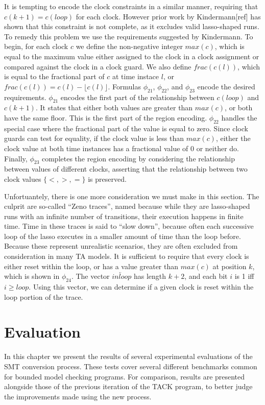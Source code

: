 \documentclass[a4paper,12pt]{article}
\begin{document}
It is tempting to encode the clock constraints in a similar manner, requiring
that \(c(k+1) = c(loop)\) for each clock. However prior work by Kindermann[ref]
has shown that this constraint is not complete, as it excludes valid
lasso-shaped runs. To remedy this problem we use the requirements suggested by
Kindermann. To begin, for each clock \(c\) we define the non-negative integer
\(max(c)\), which is equal to the maximum value either assigned to the clock in
a clock assignment or compared against the clock in a clock guard. We also
define \(frac(c(l))\), which is equal to the fractional part of \(c\) at time
instace \(l\), or \(frac(c(l)) = c(l) - \lfloor c(l) \rfloor\). Formulas
\(\phi_{21}\), \(\phi_{22}\), and \(\phi_{23}\) encode the desired requirements.
\(\phi_{21}\) encodes the first part of the relationship between \(c(loop)\) and
\(c(k+1)\). It states that either both values are greater than \(max(c)\), or
both have the same floor. This is the first part of the region encoding.
\(\phi_{22}\) handles the special case where the fractional part of the value is
equal to zero. Since clock guards can test for equality, if the clock value is
less than \(max(c)\), either the clock value at both time instances has a
fractional value of 0 or neither do. Finally, \(\phi_{23}\) completes the region
encoding by considering the relationship between values of different clocks,
asserting that the relationship between two clock values \(\{<,>,=\}\) is
preserved.

Unfortuantely, there is one more consideration we must make in this section. The
culprit are so-called ``Zeno traces'', named because while they are lasso-shaped
runs with an infinite number of transitions, their execution happens in finite
time. Time in these traces is said to ``slow down'', because often each successive
loop of the lasso executes in a smaller amount of time than the loop before.
Because these represent unrealistic scenarios, they are often excluded from
consideration in many TA models. It is sufficient to require that every clock is
either reset within the loop, or has a value greater than \(max(c)\) at position
\(k\), which is shown in \(\phi_{24}\). The vector \(\overleftarrow{inloop}\)
has length \(k+2\), and each bit \(i\) is 1 iff \(i \geq loop\). Using this
vector, we can determine if a given clock is reset within the loop portion of
the trace.


\section{Evaluation}
\label{sec:org3630bc5}
In this chapter we present the results of several experimental evaluations of
the SMT conversion process. These tests cover several different benchmarks
common for bounded model checking programs. For comparison, results are
presented alongside those of the previous iteration of the TACK program, to
better judge the improvements made using the new process.
\end{document}
